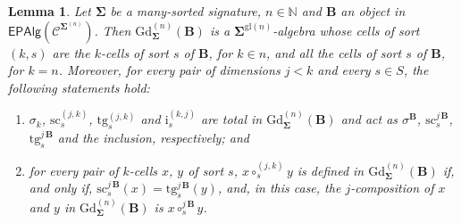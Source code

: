 \documentclass[a4paper, reqno
]{amsart}
\newcommand{\sig}[1]{\mathbf{#1}}             %
\newcommand{\spec}[1]{\boldsymbol{\mathcal{#1}}} %
\newcommand{\gl}{\mathrm{gl}}                %
\newcommand{\src}{\mathrm{sc}}
\newcommand{\tgt}{\mathrm{tg}}
\newcommand{\Gd}{\mathrm{Gd}}
\theoremstyle{plain}
\newtheorem{lemma}[theorem]{Lemma}
\theoremstyle{definition}
\begin{document}
\begin{lemma}\label{LGradDescription}
Let $\sig{\Sigma}$ be a many-sorted signature, $n\in\mathbb{N}$ and $\mathbf{B}$ an object in $\mathsf{EPAlg}(\spec{C}^{\sig{\Sigma}^{(n)}})$.
Then $\Gd^{(n)}_{\sig{\Sigma}}(\mathbf{B})$ is a $\sig{\Sigma}^{\gl(n)}$-algebra whose cells of sort $(k,s)$ are the $k$-cells of sort $s$ of $\mathbf{B}$, for $k\in n$, and all the cells of sort $s$ of $\mathbf{B}$, for $k=n$.
Moreover, for every pair of dimensions $j<k$ and every $s\in S$, the following statements hold:
\begin{enumerate}
\item $\sigma_{k}$, $\src^{(j,k)}_{s}$, $\tgt^{(j,k)}_{s}$ and $\mathrm{i}^{(k,j)}_{s}$ are total in $\Gd^{(n)}_{\sig{\Sigma}}(\mathbf{B})$ and act as $\sigma^{\mathbf{B}}$, $\src^{j\,\mathbf{B}}_{s}$, $\tgt^{j\,\mathbf{B}}_{s}$ and the inclusion, respectively; and
\item for every pair of $k$-cells $x$, $y$ of sort $s$, $x\circ^{(j,k)}_{s}y$ is defined in $\Gd^{(n)}_{\sig{\Sigma}}(\mathbf{B})$ if, and only if, $\src^{j\,\mathbf{B}}_{s}(x)=\tgt^{j\,\mathbf{B}}_{s}(y)$, and, in this case, the $j$-composition of $x$ and $y$ in $\Gd^{(n)}_{\sig{\Sigma}}(\mathbf{B})$ is $x\circ^{j\,\mathbf{B}}_{s}y$.
\end{enumerate}
\end{lemma}
\end{document}

